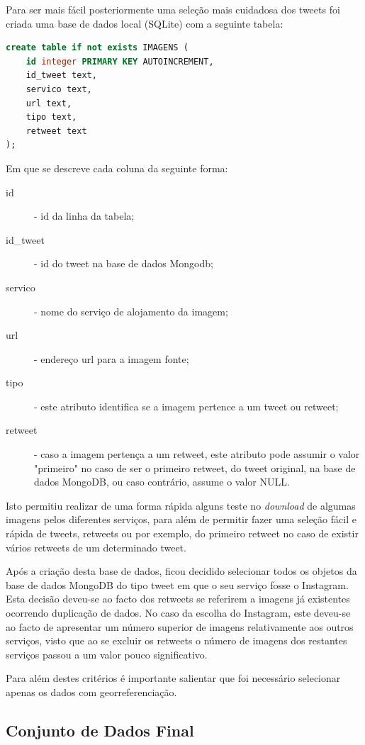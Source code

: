 Para ser mais fácil posteriormente uma seleção mais cuidadosa dos tweets foi criada uma base de dados local (SQLite) com a seguinte tabela:

\begin{lstlisting}[language=SQL]
create table if not exists IMAGENS ( 
	id integer PRIMARY KEY AUTOINCREMENT, 
	id_tweet text, 
	servico text, 
	url text, 
	tipo text, 
	retweet text 
); 
\end{lstlisting}

Em que se descreve cada coluna da seguinte forma:

\begin{description}
\item[id] - id da linha da tabela;
\item[id\_tweet] - id do tweet na base de dados Mongodb;
\item[servico] - nome do serviço de alojamento da imagem;
\item[url] - endereço url para a imagem fonte;
\item[tipo] - este atributo identifica se a imagem pertence a um tweet ou retweet;
\item[retweet] - caso a imagem pertença a um retweet, este atributo pode assumir o valor "primeiro" no caso de ser o primeiro retweet, do tweet original, na base de dados MongoDB, ou caso contrário, assume o valor NULL.
\end{description}

Isto permitiu realizar de uma forma rápida alguns teste no \textit{download} de algumas imagens pelos diferentes serviços, para além de permitir fazer uma seleção fácil e rápida de tweets, retweets ou por exemplo, do primeiro retweet no caso de existir vários retweets de um determinado tweet. 

Após a criação desta base de dados, ficou decidido selecionar todos os objetos da base de dados MongoDB do tipo tweet em que o seu serviço fosse o Instagram. Esta decisão deveu-se ao facto dos retweets se referirem a imagens já existentes ocorrendo duplicação de dados. No caso da escolha do Instagram, este deveu-se ao facto de apresentar um número superior de imagens relativamente aos outros serviços, visto que ao se excluir os retweets o número de imagens dos restantes serviços passou a um valor pouco significativo.

Para além destes critérios é importante salientar que foi necessário selecionar apenas os dados com georreferenciação. 

\subsection{Conjunto de Dados Final}

